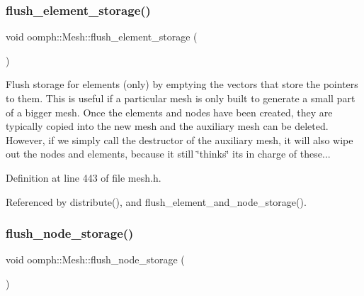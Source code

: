 \mbox{\label{classoomph_1_1Mesh_a3def47aa1e0028970a250d9c534e93b2}} 
\subsubsection{\texorpdfstring{flush\+\_\+element\+\_\+storage()}{flush\_element\_storage()}}
{\footnotesize\ttfamily void oomph\+::\+Mesh\+::flush\+\_\+element\+\_\+storage (\begin{DoxyParamCaption}{ }\end{DoxyParamCaption})\hspace{0.3cm}{\ttfamily [inline]}}



Flush storage for elements (only) by emptying the vectors that store the pointers to them. This is useful if a particular mesh is only built to generate a small part of a bigger mesh. Once the elements and nodes have been created, they are typically copied into the new mesh and the auxiliary mesh can be deleted. However, if we simply call the destructor of the auxiliary mesh, it will also wipe out the nodes and elements, because it still \char`\"{}thinks\char`\"{} it\textquotesingle{}s in charge of these... 



Definition at line 443 of file mesh.\+h.



Referenced by distribute(), and flush\+\_\+element\+\_\+and\+\_\+node\+\_\+storage().

\mbox{\label{classoomph_1_1Mesh_ab4773924237488f46fe5ad3fe49138f0}} 
\subsubsection{\texorpdfstring{flush\+\_\+node\+\_\+storage()}{flush\_node\_storage()}}
{\footnotesize\ttfamily void oomph\+::\+Mesh\+::flush\+\_\+node\+\_\+storage (\begin{DoxyParamCaption}{ }\end{DoxyParamCaption})\hspace{0.3cm}{\ttfamily [inline]}}



